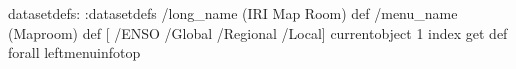 \begin{ingrid}
datasetdefs:
:datasetdefs
/long_name (IRI Map Room) def
/menu_name (Maproom) def
[ /ENSO /Global /Regional /Local]
{ currentobject 1 index get  def} forall
leftmenuinfotop
\end{ingrid}
